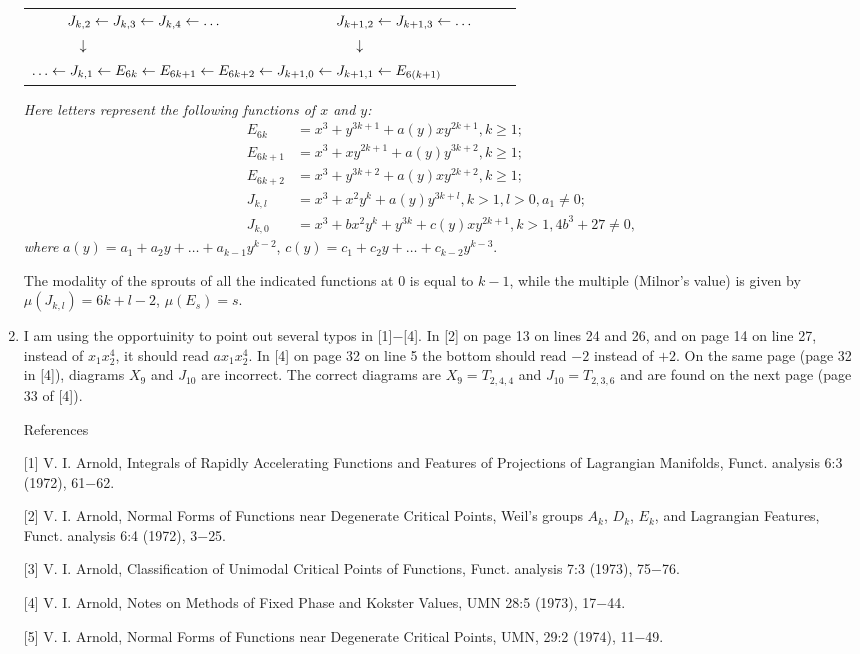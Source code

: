 \documentclass{article}
\begin{document}
\begin{enumerate}
\begin{tabular}[c]{c}
$J_{k,2}\leftarrow J_{k,3}\leftarrow J_{k,4}\leftarrow\ldots\hspace{19ex}
J_{k+1,2}\leftarrow J_{k+1,3}\leftarrow\ldots$\\
$\downarrow\hspace{45ex}\downarrow\hspace{16ex}$\\
$\ldots\leftarrow J_{k,1}\leftarrow E_{6k}\leftarrow E_{6k+1}\leftarrow E_{6k+2}
\leftarrow J_{k+1,0}\leftarrow J_{k+1,1}\leftarrow E_{6(k+1)}\hspace{11ex}$
\end{tabular}

\textit{Here letters represent the following functions of $x$ and $y$:}
\begin{align*}
E_{6k}&=x^3+y^{3k+1}+a(y)xy^{2k+1},k\geq1;\\
E_{6k+1}&=x^3+xy^{2k+1}+a(y)y^{3k+2},k\geq1;\\
E_{6k+2}&=x^3+y^{3k+2}+a(y)xy^{2k+2},k\geq1;\\
J_{k,l}&=x^3+x^2y^k+a(y)y^{3k+l},k>1,l>0,a_1\neq0;\\
J_{k,0}&=x^3+bx^2y^k+y^{3k}+c(y)xy^{2k+1},k>1,4b^3+27\neq0,
\end{align*}
\textit{where }$a(y)=a_1+a_2y+\ldots+a_{k-1}y^{k-2}$, $c(y)=c_1+c_2y+\ldots+c_{k-2}y^{k-3}$.

The modality of the sprouts of all the indicated functions at 0 is equal to
$k-1$, while the multiple (Milnor's value) is given by $\mu(J_{k,l})=6k+l-2$,
$\mu(E_s)=s$.
\item
I am using the opportuinity to point out several typos in [1]$-$[4].
In [2] on page 13 on lines 24 and 26, and on page 14 on line 27, instead of
$x_1x^4_2$, it should read $ax_1x^4_2$.
In [4] on page 32 on line 5 the bottom should read $-2$ instead of $+2$.
On the same page (page 32 in [4]), diagrams $X_9$ and $J_{10}$ are incorrect.
The correct diagrams are $X_9=T_{2,4,4}$ and $J_{10}=T_{2,3,6}$ and are found on
the next page (page 33 of [4]).

References

[1] V. I. Arnold, Integrals of Rapidly Accelerating Functions and Features of
Projections of Lagrangian Manifolds, Funct. analysis 6:3 (1972), 61$-$62.

[2] V. I. Arnold, Normal Forms of Functions near Degenerate Critical Points,
Weil's groups $A_k$, $D_k$, $E_k$, and Lagrangian Features, Funct. analysis 6:4
(1972), 3$-$25.

[3] V. I. Arnold, Classification of Unimodal Critical Points of Functions,
Funct. analysis 7:3 (1973), 75$-$76.

[4] V. I. Arnold, Notes on Methods of Fixed Phase and Kokster Values, UMN 28:5
(1973), 17$-$44.

[5] V. I. Arnold, Normal Forms of Functions near Degenerate Critical Points,
UMN, 29:2 (1974), 11$-$49.
\end{enumerate}
\end{document}
